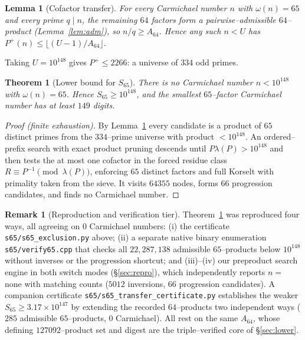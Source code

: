 \documentclass[11pt]{article}
\newtheorem{theorem}{Theorem}
\newtheorem{lemma}{Lemma}
\theoremstyle{definition}
\newtheorem{remark}{Remark}
\newcommand{\Pp}{P^{+}}
\newcommand{\code}[1]{\texttt{#1}}
\begin{document}
\begin{lemma}[Cofactor transfer]\label{lem:transfer}
For every Carmichael number $n$ with $\omega(n)=65$ and every prime $q\mid n$, the remaining $64$
factors form a pairwise--admissible $64$--product (Lemma~\ref{lem:adm}), so $n/q\ge A_{64}$. Hence any
such $n<U$ has $\Pp(n)\le\lfloor(U-1)/A_{64}\rfloor$.
\end{lemma}

Taking $U=10^{148}$ gives $\Pp\le 2266$: a universe of $334$ odd primes.

\begin{theorem}[Lower bound for $S_{65}$]\label{thm:s65}
There is no Carmichael number $n<10^{148}$ with $\omega(n)=65$. Hence $S_{65}\ge 10^{148}$, and the
smallest $65$--factor Carmichael number has at least $149$ digits.
\end{theorem}

\begin{proof}[Proof (finite exhaustion)]
By Lemma~\ref{lem:transfer} every candidate is a product of $65$ distinct primes from the $334$--prime
universe with product $<10^{148}$. An ordered--prefix search with exact product pruning descends until
$P\lambda(P)>10^{148}$ and then tests the at most one cofactor in the forced residue class
$R\equiv P^{-1}\pmod{\lambda(P)}$, enforcing $65$ distinct factors and full Korselt with primality
taken from the sieve. It visits $64355$ nodes, forms $66$ progression candidates, and finds no
Carmichael number.
\end{proof}

\begin{remark}[Reproduction and verification tier]
Theorem~\ref{thm:s65} was reproduced four ways, all agreeing on $0$ Carmichael numbers:
(i) the certificate \code{s65/s65\_exclusion.py} above; (ii) a separate native binary
enumeration \code{s65/verify65.cpp} that checks all $22{,}287{,}138$ admissible $65$--products below
$10^{148}$ without inverses or the progression shortcut; and (iii)--(iv) our preproduct search engine
in both switch modes (\S\ref{sec:repro}), which independently reports $n=$ none with matching
counts ($5012$ inversions, $66$ progression candidates). A companion certificate
\code{s65/s65\_transfer\_certificate.py} establishes the weaker $S_{65}\ge 3.17\times10^{147}$ by
extending the recorded $64$--products two independent ways ($285$ admissible $65$--products, $0$
Carmichael). All rest on the same $A_{64}$, whose defining $127092$--product set and digest are the
triple--verified core of \S\ref{sec:lower}.
\end{remark}
\end{document}
